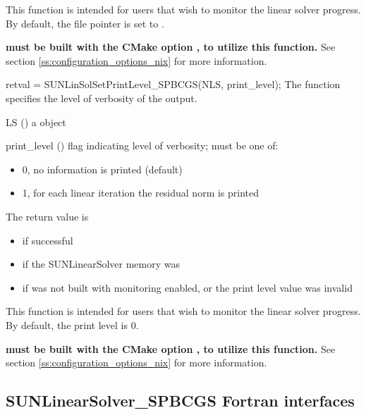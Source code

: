 {
  This function is intended for users that wish to monitor the linear
  solver progress. By default, the file pointer is set to .

  \textbf{{\sundials} must be built with the CMake option
  , to utilize this function.}
  See section \ref{ss:configuration_options_nix} for more information.
}
%
%
{
  retval = SUNLinSolSetPrintLevel\_SPBCGS(NLS, print\_level);
}
{
  The function  specifies the level
  of verbosity of the output.
}
{
  \begin{args}
  \item[LS] ()
    a {\sunnonlinsol} object
  \item[print\_level] () flag indicating level of verbosity;
    must be one of:
    \begin{itemize}
      \item 0, no information is printed (default)
      \item 1, for each linear iteration the residual norm is printed
    \end{itemize}
  \end{args}
}
{
  The return value is
  \begin{itemize}
    \item {} if successful
    \item {} if the SUNLinearSolver memory was 
    \item {} if {\sundials} was not built with monitoring enabled,
      or the print level value was invalid
  \end{itemize}
}
{
  This function is intended for users that wish to monitor the linear
  solver progress. By default, the print level is 0.

  \textbf{{\sundials} must be built with the CMake option
  , to utilize this function.}
  See section \ref{ss:configuration_options_nix} for more information.
}


\subsection{SUNLinearSolver\_SPBCGS Fortran interfaces}
\label{ss:sunlinsol_spbcgs_fortran}

